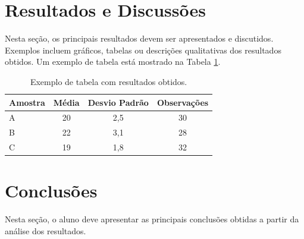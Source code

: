 \documentclass[conference]{IEEEtran}
\begin{document}
\section{Resultados e Discussões}

Nesta seção, os principais resultados devem ser apresentados e discutidos. Exemplos incluem gráficos, tabelas ou descrições qualitativas dos resultados obtidos. Um exemplo de tabela está mostrado na Tabela \ref{tab:resultados}.

\begin{table}[H]
    \centering
    \caption{Exemplo de tabela com resultados obtidos.}
    \label{tab:resultados}
    \begin{tabular}{@{}lccc@{}}
        \toprule
        \textbf{Amostra} & \textbf{Média} & \textbf{Desvio Padrão} & \textbf{Observações} \\
        \midrule
        A & 20 & 2,5 & 30 \\
        B & 22 & 3,1 & 28 \\
        C & 19 & 1,8 & 32 \\
        \bottomrule
    \end{tabular}
\end{table}

\section{Conclusões}

Nesta seção, o aluno deve apresentar as principais conclusões obtidas a partir da análise dos resultados.



\end{document}

